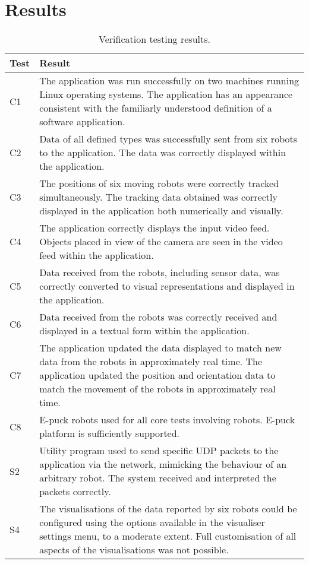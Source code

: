 \section{Results}
\begin{longtable}{ l p{10cm} }
\caption[Verification Testing Results]{Verification testing results.}\\
 \textbf{Test} & \textbf{Result}\\
 \hline
 C1 & The application was run successfully on two machines running Linux operating systems. The application has an appearance consistent with the familiarly understood definition of a software application.\\\hline
 C2 & Data of all defined types was successfully sent from six robots to the application. The data was correctly displayed within the application.\\\hline
 C3 & The positions of six moving robots were correctly tracked simultaneously. The tracking data obtained was correctly displayed in the application both numerically and visually.\\\hline
 C4 & The application correctly displays the input video feed. Objects placed in view of the camera are seen in the video feed within the application.\\\hline
 C5 & Data received from the robots, including sensor data, was correctly converted to visual representations and displayed in the application.\\\hline
 C6 & Data received from the robots was correctly received and displayed in a textual form within the application.\\\hline
 C7 & The application updated the data displayed to match new data from the robots in approximately real time. The application updated the position and orientation data to match the movement of the robots in approximately real time.\\\hline
 C8 & E-puck robots used for all core tests involving robots. E-puck platform is sufficiently supported.\\\hline
 \hline
 S2 & Utility program used to send specific UDP packets to the application via the network, mimicking the behaviour of an arbitrary robot. The system received and interpreted the packets correctly.\\\hline
 S4 & The visualisations of the data reported by six robots could be configured using the options available in the visualiser settings menu, to a moderate extent. Full customisation of all aspects of the visualisations was not possible.\\ \hline

\end{longtable}
